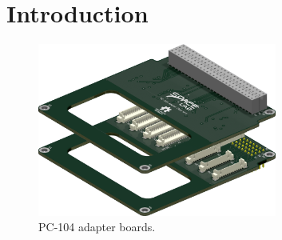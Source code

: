 %
%
%
%
%

%
%
%
%
%
%

\chapter{Introduction} \label{ch:introduction}

\begin{figure}[!htb]
    \begin{center}
        \includegraphics[width=0.7\textwidth]{figures/pc104-adapter}
        \caption{PC-104 adapter boards.}
        \label{fig:pc104-adapter}
    \end{center}
\end{figure}
